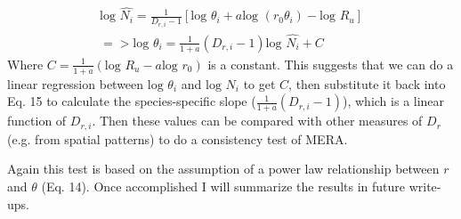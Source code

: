 \documentclass[12pt]{article}
\begin{document}
\begin{equation}
\begin{split}
 \mbox{log }\hat{N_i} = \frac{1}{D_{r,i}-1} [ \mbox{log } \theta_i + a  \mbox{log } (r_0 \theta_i) -  \mbox{log }R_u]\\
 => \mbox{log } \theta_i = \frac{1}{1+a} (D_{r,i}-1)  \mbox{log }\hat{N_i} + C
 \end{split}
\end{equation}
Where $C =  \frac{1}{1+a} ( \mbox{log }R_u - a \mbox{log } r_0)$ is a constant. This suggests that we can do a linear regression between $\mbox{log } \theta_i $ and $\mbox{log } N_i $ to get $C$, then substitute it back into Eq. 15 to calculate the species-specific slope ($\frac{1}{1+a} (D_{r,i}-1)$), which is a linear function of $D_{r,i}$. Then these values can be compared with other measures of $D_r$ (e.g. from spatial patterns) to do a consistency test of MERA. 

Again this test is based on the assumption of a power law relationship between $r$ and $\theta$ (Eq. 14). Once accomplished I will summarize the results in future write-ups.  
\end{document}
